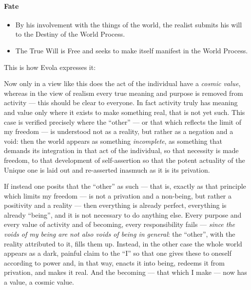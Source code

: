 \paragraph{Fate}


\begin{itemize}


\item By his involvement with the things of the world, the realist submits his will to the Destiny of the World Process.

\item The True Will is Free and seeks to make itself manifest in the World Process.
\end{itemize}

This is how Evola expresses it:

\begin{quotex}
Now only in a view like this does the act of the individual have a \emph{cosmic value}, whereas in the view of realism every true meaning and purpose is removed from activity --- this should be clear to everyone. In fact activity truly has meaning and value only where it exists to make something real, that is not yet such. This case is verified precisely where the ``other'' --- or that which reflects the limit of my freedom --- is understood not as a reality, but rather as a negation and a void: then the world appears as something \emph{incomplete}, as something that demands its integration in that act of the individual, so that necessity is made freedom, to that development of self-assertion so that the potent actuality of the Unique one is laid out and re-asserted inasmuch as it is its privation.

If instead one posits that the ``other'' as such --- that is, exactly as that principle which limits my freedom --- is not a privation and a non-being, but rather a positivity and a reality --- then everything is already perfect, everything is already ``being'', and it is not necessary to do anything else. Every purpose and every value of activity and of becoming, every responsibility fails --- \emph{since the voids of my being are not also voids of being in general}: the ``other'', with the reality attributed to it, fills them up. Instead, in the other case the whole world appears as a dark, painful claim to the ``I'' so that one gives these to oneself according to power and, in that way, enacts it into being, redeems it from privation, and makes it real. And the becoming --- that which I make --- now has a value, a cosmic value.
\end{quotex}


